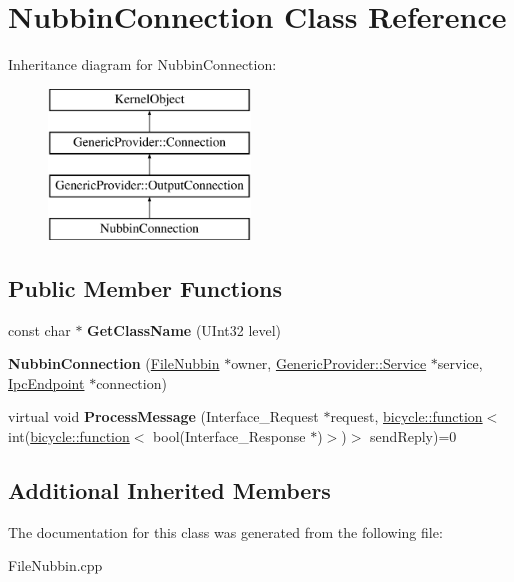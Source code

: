 \hypertarget{class_nubbin_connection}{}\section{Nubbin\+Connection Class Reference}
\label{class_nubbin_connection}
Inheritance diagram for Nubbin\+Connection\+:\begin{figure}[H]
\begin{center}
\leavevmode
\includegraphics[height=4.000000cm]{class_nubbin_connection}
\end{center}
\end{figure}
\subsection*{Public Member Functions}
\begin{DoxyCompactItemize}
\item 
\mbox{\label{class_nubbin_connection_af3c8ac78684700cacf4e53d94f11618b}} 
const char $\ast$ {\bfseries Get\+Class\+Name} (U\+Int32 level)
\item 
\mbox{\label{class_nubbin_connection_a1af6beeb57aba584b44b3d2cf5e5627b}} 
{\bfseries Nubbin\+Connection} (\hyperlink{class_file_nubbin}{File\+Nubbin} $\ast$owner, \hyperlink{class_generic_provider_1_1_service}{Generic\+Provider\+::\+Service} $\ast$service, \hyperlink{class_ipc_endpoint}{Ipc\+Endpoint} $\ast$connection)
\item 
\mbox{\label{class_nubbin_connection_a1787cf93e6cc433f1c34b585213f31f8}} 
virtual void {\bfseries Process\+Message} (Interface\+\_\+\+Request $\ast$request, \hyperlink{classbicycle_1_1function}{bicycle\+::function}$<$ int(\hyperlink{classbicycle_1_1function}{bicycle\+::function}$<$ bool(Interface\+\_\+\+Response $\ast$)$>$)$>$ send\+Reply)=0
\end{DoxyCompactItemize}
\subsection*{Additional Inherited Members}


The documentation for this class was generated from the following file\+:\begin{DoxyCompactItemize}
\item 
File\+Nubbin.\+cpp\end{DoxyCompactItemize}
